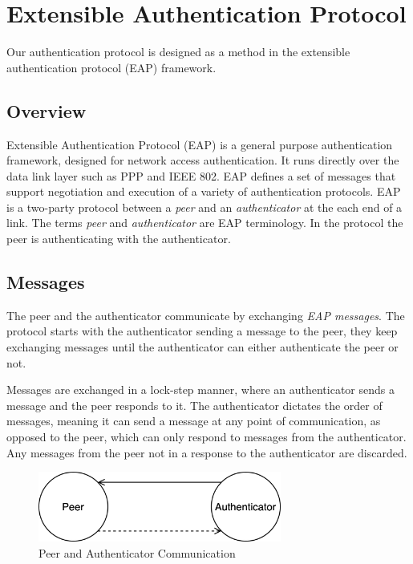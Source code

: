 \section{Extensible Authentication Protocol}
\label{section:eap}
Our authentication protocol is designed as a method in the extensible authentication protocol (EAP) framework.


\subsection{Overview}
Extensible Authentication Protocol \cite{aboba2004extensible} (EAP) is a general purpose authentication framework, designed for network access authentication. 
It runs directly over the data link layer such as PPP  \cite{simpson1994rfc1661} and IEEE 802.
EAP defines a set of messages that support negotiation and execution of a variety of authentication protocols.
EAP is a two-party protocol between a \textit{peer} and an \textit{authenticator} at the each end of a link. The terms \textit{peer} and \textit{authenticator} are EAP terminology.
In the protocol the peer is authenticating with the authenticator.

\subsection{Messages}
The peer and the authenticator communicate by exchanging \textit{EAP messages}.
The protocol starts with the authenticator sending a message to the peer, they keep exchanging messages until the authenticator can either authenticate the peer or not.

Messages are exchanged in a lock-step manner, where an authenticator sends a message and the peer responds to it. 
The authenticator dictates the order of messages, meaning it can send a message at any point of communication, as opposed to the peer, which can only respond to messages from the authenticator.
Any messages from the peer not in a response to the authenticator are discarded.

\begin{figure}[h]
	\centering
	\includegraphics[width=8cm]{images/eap-messages}
	\caption{Peer and Authenticator Communication}
	\label{fig:eap-messages}
\end{figure}

